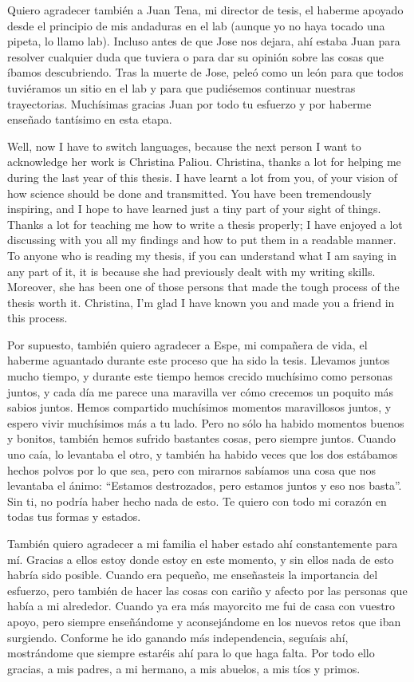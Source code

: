 \documentclass[
11pt, %
english, %
singlespacing, %
headsepline, %
chapterinoneline, %
]{MastersDoctoralThesis} %
\begin{document}
\begin{acknowledgements}
Quiero agradecer también a Juan Tena, mi director de tesis, el haberme apoyado desde el principio de mis andaduras en el lab (aunque yo no haya tocado una pipeta, lo llamo lab). Incluso antes de que Jose nos dejara, ahí estaba Juan para resolver cualquier duda que tuviera o para dar su opinión sobre las cosas que íbamos descubriendo. Tras la muerte de Jose, peleó como un león para que todos tuviéramos un sitio en el lab y para que pudiésemos continuar nuestras trayectorias. Muchísimas gracias Juan por todo tu esfuerzo y por haberme enseñado tantísimo en esta etapa. 

Well, now I have to switch languages, because the next person I want to acknowledge her work is Christina Paliou. Christina, thanks a lot for helping me during the last year of this thesis. I have learnt a lot from you, of your vision of how science should be done and transmitted. You have been tremendously inspiring, and I hope to have learned just a tiny part of your sight of things. Thanks a lot for teaching me how to write a thesis properly; I have enjoyed a lot discussing with you all my findings and how to put them in a readable manner. To anyone who is reading my thesis, if you can understand what I am saying in any part of it, it is because she had previously dealt with my writing skills. Moreover, she has been one of those persons that made the tough process of the thesis worth it. Christina, I’m glad I have known you and made you a friend in this process.  

Por supuesto, también quiero agradecer a Espe, mi compañera de vida, el haberme aguantado durante este proceso que ha sido la tesis. Llevamos juntos mucho tiempo, y durante este tiempo hemos crecido muchísimo como personas juntos, y cada día me parece una maravilla ver cómo crecemos un poquito más sabios juntos. Hemos compartido muchísimos momentos maravillosos juntos, y espero vivir muchísimos más a tu lado. Pero no sólo ha habido momentos buenos y bonitos, también hemos sufrido bastantes cosas, pero siempre juntos. Cuando uno caía, lo levantaba el otro, y también ha habido veces que los dos estábamos hechos polvos por lo que sea, pero con mirarnos sabíamos una cosa que nos levantaba el ánimo: “Estamos destrozados, pero estamos juntos y eso nos basta”.  Sin ti, no podría haber hecho nada de esto. Te quiero con todo mi corazón en todas tus formas y estados. 

También quiero agradecer a mi familia el haber estado ahí constantemente para mí. Gracias a ellos estoy donde estoy en este momento, y sin ellos nada de esto habría sido posible. Cuando era pequeño, me enseñasteis la importancia del esfuerzo, pero también de hacer las cosas con cariño y afecto por las personas que había a mi alrededor. Cuando ya era más mayorcito me fui de casa con vuestro apoyo, pero siempre enseñándome y aconsejándome en los nuevos retos que iban surgiendo. Conforme he ido ganando más independencia, seguíais ahí, mostrándome que siempre estaréis ahí para lo que haga falta. Por todo ello gracias, a mis padres, a mi hermano, a mis abuelos, a mis tíos y primos.  


\end{acknowledgements}
\end{document}
